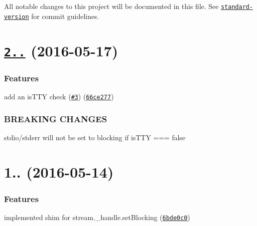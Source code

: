All notable changes to this project will be documented in this file. See \href{https://github.com/conventional-changelog/standard-version}{\tt standard-\/version} for commit guidelines.

\label{_2.0.0}%
 \section*{\href{https://github.com/yargs/set-blocking/compare/v1.0.0...v2.0.0}{\tt 2..} (2016-\/05-\/17)}

\subsubsection*{Features}


\begin{DoxyItemize}
\item add an is\+T\+TY check (\href{https://github.com/yargs/set-blocking/issues/3}{\tt \#3}) (\href{https://github.com/yargs/set-blocking/commit/66ce277}{\tt 66ce277})
\end{DoxyItemize}

\subsubsection*{B\+R\+E\+A\+K\+I\+NG C\+H\+A\+N\+G\+ES}


\begin{DoxyItemize}
\item stdio/stderr will not be set to blocking if is\+T\+TY === false
\end{DoxyItemize}

\label{_1.0.0}%
 \section*{1.. (2016-\/05-\/14)}

\subsubsection*{Features}


\begin{DoxyItemize}
\item implemented shim for stream.\+\_\+handle.\+set\+Blocking (\href{https://github.com/yargs/set-blocking/commit/6bde0c0}{\tt 6bde0c0}) 
\end{DoxyItemize}